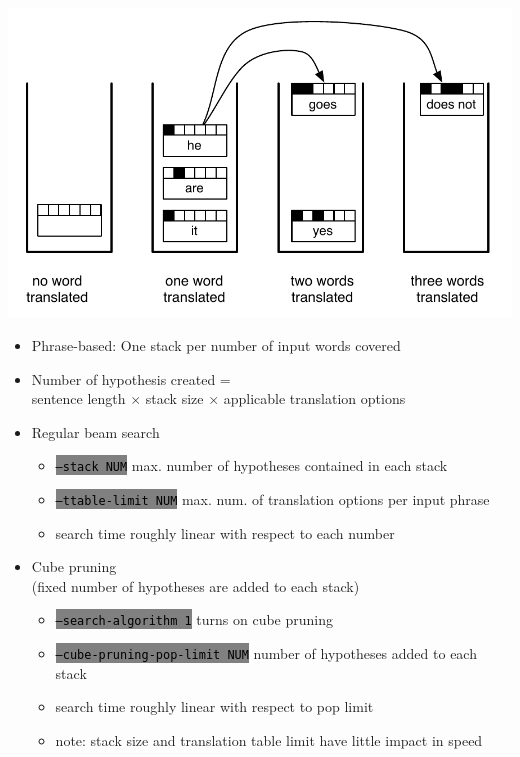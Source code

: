 \documentclass[landscape]{uedslides2C}
\newcommand{\littlecode}[1]{\colorbox{gray}{\textcolor{black}{\small \tt #1}}}
\begin{document}

\begin{center} 
\includegraphics[scale=1]{hypothesis-stacks-fw.pdf}
\end{center}
\vspace{-2mm}
\begin{itemize} \itemsep -2mm
\item Phrase-based: One stack per number of input words covered
\item Number of hypothesis created = \\
sentence length $\times$ stack size $\times$ applicable translation options
\end{itemize}


\begin{itemize}
\item Regular beam search
\begin{itemize}
\item \littlecode{--stack NUM} max. number of hypotheses contained in each stack
\item \littlecode{--ttable-limit NUM} max. num. of translation options per input phrase
\vspace{2mm}
\item search time roughly linear with respect to each number
\end{itemize}
\item Cube pruning\\
(fixed number of hypotheses are added to each stack)
\begin{itemize}
\item \littlecode{--search-algorithm 1} turns on cube pruning
\item \littlecode{--cube-pruning-pop-limit NUM} number of hypotheses added to each stack
\vspace{2mm}
\item search time roughly linear with respect to pop limit
\vspace{2mm}
\item note: stack size and translation table limit have little impact in speed
\end{itemize}
\end{itemize}
\end{document}
